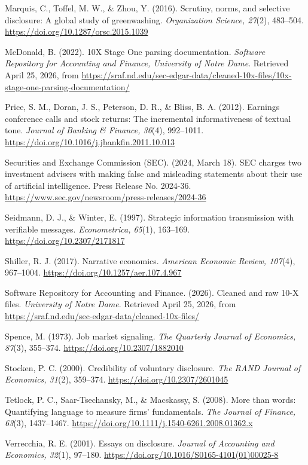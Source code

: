 Marquis, C., Toffel, M. W., \& Zhou, Y. (2016). Scrutiny, norms, and selective disclosure: A global study of greenwashing. \textit{Organization Science, 27}(2), 483--504. \url{https://doi.org/10.1287/orsc.2015.1039}

McDonald, B. (2022). 10X Stage One parsing documentation. \textit{Software Repository for Accounting and Finance, University of Notre Dame}. Retrieved April 25, 2026, from \url{https://sraf.nd.edu/sec-edgar-data/cleaned-10x-files/10x-stage-one-parsing-documentation/}

Price, S. M., Doran, J. S., Peterson, D. R., \& Bliss, B. A. (2012). Earnings conference calls and stock returns: The incremental informativeness of textual tone. \textit{Journal of Banking \& Finance, 36}(4), 992--1011. \url{https://doi.org/10.1016/j.jbankfin.2011.10.013}

Securities and Exchange Commission (SEC). (2024, March 18). SEC charges two investment advisers with making false and misleading statements about their use of artificial intelligence. Press Release No. 2024-36. \url{https://www.sec.gov/newsroom/press-releases/2024-36}

Seidmann, D. J., \& Winter, E. (1997). Strategic information transmission with verifiable messages. \textit{Econometrica, 65}(1), 163--169. \url{https://doi.org/10.2307/2171817}

Shiller, R. J. (2017). Narrative economics. \textit{American Economic Review, 107}(4), 967--1004. \url{https://doi.org/10.1257/aer.107.4.967}

Software Repository for Accounting and Finance. (2026). Cleaned and raw 10-X files. \textit{University of Notre Dame}. Retrieved April 25, 2026, from \url{https://sraf.nd.edu/sec-edgar-data/cleaned-10x-files/}

Spence, M. (1973). Job market signaling. \textit{The Quarterly Journal of Economics, 87}(3), 355--374. \url{https://doi.org/10.2307/1882010}

Stocken, P. C. (2000). Credibility of voluntary disclosure. \textit{The RAND Journal of Economics, 31}(2), 359--374. \url{https://doi.org/10.2307/2601045}

Tetlock, P. C., Saar-Tsechansky, M., \& Macskassy, S. (2008). More than words: Quantifying language to measure firms' fundamentals. \textit{The Journal of Finance, 63}(3), 1437--1467. \url{https://doi.org/10.1111/j.1540-6261.2008.01362.x}

Verrecchia, R. E. (2001). Essays on disclosure. \textit{Journal of Accounting and Economics, 32}(1), 97--180. \url{https://doi.org/10.1016/S0165-4101(01)00025-8}

\endgroup
